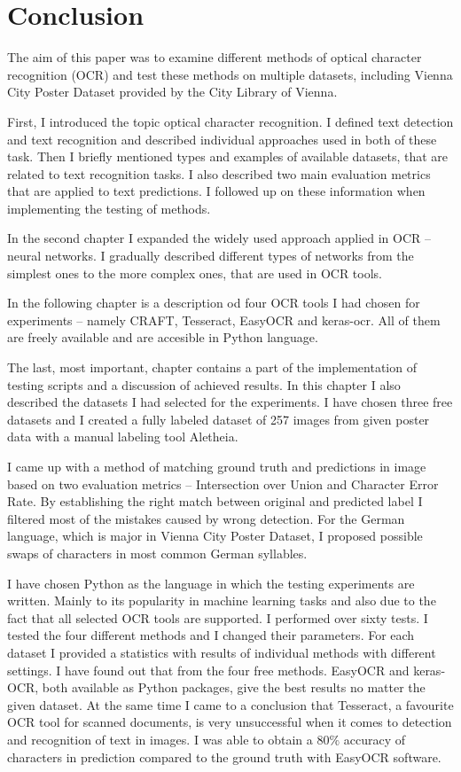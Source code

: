 \chapter*{Conclusion}

The aim of this paper was to examine different methods of optical character recognition (OCR) and test these methods on multiple datasets, including Vienna City Poster Dataset provided by the City Library of Vienna.

First, I introduced the topic optical character recognition. I defined text detection and text recognition and described individual approaches used in both of these task. Then I briefly mentioned types and examples of available datasets, that are related to text recognition tasks. I also described two main evaluation metrics that are applied to text predictions. I followed up on these information when implementing the testing of methods.

In the second chapter I expanded the widely used approach applied in OCR -- neural networks. I gradually described different types of networks from the simplest ones to the more complex ones, that are used in OCR tools. 

In the following chapter is a description od four OCR tools I had chosen for experiments -- namely CRAFT, Tesseract, EasyOCR and keras-ocr. All of them are freely available and are accesible in Python language.

The last, most important, chapter contains a part of the implementation of testing scripts and a discussion of achieved results. In this chapter I also described the datasets I had selected for the experiments. I have chosen three free datasets and I created a fully labeled dataset of 257 images from given poster data with a manual labeling tool Aletheia.

I came up with a method of matching ground truth and predictions in image based on two evaluation metrics -- Intersection over Union and Character Error Rate. By establishing the right match between original and predicted label I filtered most of the mistakes caused by wrong detection. For the German language, which is major in Vienna City Poster Dataset, I proposed  possible swaps of characters in most common German syllables.

I have chosen Python as the language in which the testing experiments are written. Mainly to its popularity in machine learning tasks and also due to the fact that all selected OCR tools are supported. I performed over sixty tests. I tested the four different methods and I changed their parameters. For each dataset I provided a statistics with results of individual methods with different settings. I have found out that from the four free methods. EasyOCR and keras-OCR, both available as Python packages, give the best results no matter the given dataset. At the same time I came to a conclusion that Tesseract, a favourite OCR tool for scanned documents, is very unsuccessful when it comes to detection and recognition of text in images. I was able to obtain a $80\%$  accuracy of characters in prediction compared to the ground truth with EasyOCR software.

